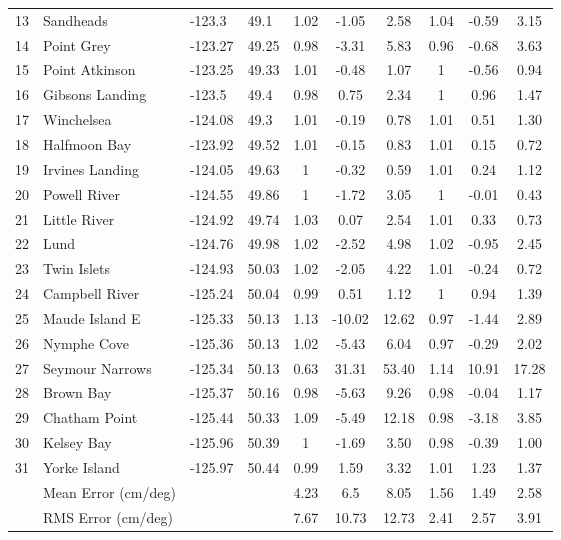 \documentclass[letterpaper]{tATO2e}
\begin{document}
\begin{table}[h]
{\begin{tabular}{l l l l c c c c c c}
13 & Sandheads & -123.3 & 49.1 & 1.02 & -1.05 & 2.58  & 1.04 & -0.59 & 3.15 \\
14 & Point Grey & -123.27 & 49.25 & 0.98 & -3.31 & 5.83  & 0.96 & -0.68 & 3.63 \\
15 & Point Atkinson & -123.25 & 49.33 & 1.01 & -0.48 & 1.07  & 1 & -0.56 & 0.94 \\
16 & Gibsons Landing & -123.5 & 49.4 & 0.98 & 0.75 & 2.34  & 1 & 0.96 & 1.47 \\
17 & Winchelsea & -124.08 & 49.3 & 1.01 & -0.19 & 0.78  & 1.01 & 0.51 & 1.30 \\
18 & Halfmoon Bay & -123.92 & 49.52 & 1.01 & -0.15 & 0.83  & 1.01 & 0.15 & 0.72\\ 
19 & Irvines Landing & -124.05 & 49.63 & 1 & -0.32 & 0.59  & 1.01 & 0.24 & 1.12 \\
20 & Powell River & -124.55 & 49.86 & 1 & -1.72 & 3.05  & 1 & -0.01 & 0.43 \\
21 & Little River & -124.92 & 49.74 & 1.03 & 0.07 & 2.54  & 1.01 & 0.33 & 0.73\\ 
22 & Lund & -124.76 & 49.98 & 1.02 & -2.52 & 4.98  & 1.02 & -0.95 & 2.45 \\
23 & Twin Islets & -124.93 & 50.03 & 1.02 & -2.05 & 4.22  & 1.01 & -0.24 & 0.72\\ 
24 & Campbell River & -125.24 & 50.04 & 0.99 & 0.51 & 1.12  & 1 & 0.94 & 1.39 \\
25 & Maude Island E & -125.33 & 50.13 & 1.13 & -10.02 & 12.62  & 0.97 & -1.44 & 2.89\\ 
26 & Nymphe Cove & -125.36 & 50.13 & 1.02 & -5.43 & 6.04  & 0.97 & -0.29 & 2.02 \\
27 & Seymour Narrows & -125.34 & 50.13 & 0.63 & 31.31 & 53.40  & 1.14 & 10.91 & 17.28 \\
28 & Brown Bay & -125.37 & 50.16 & 0.98 & -5.63 & 9.26  & 0.98 & -0.04 & 1.17 \\
29 & Chatham Point & -125.44 & 50.33 & 1.09 & -5.49 & 12.18  & 0.98 & -3.18 & 3.85 \\
30 & Kelsey Bay & -125.96 & 50.39 & 1 & -1.69 & 3.50  & 0.98 & -0.39 & 1.00 \\
31 & Yorke Island & -125.97 & 50.44 & 0.99 & 1.59 & 3.32  & 1.01 & 1.23 & 1.37\\ 
\hline 
&   Mean Error (cm/deg) & & & 4.23  & 6.5 & 8.05   & 1.56 & 1.49 & 2.58 \\
&   RMS Error (cm/deg)  & & & 7.67  & 10.73 & 12.73 & 2.41 & 2.57 & 3.91 \\
\hline  
\end{tabular}}
\label{tab:comparison} 
\end{table}
\end{document}
